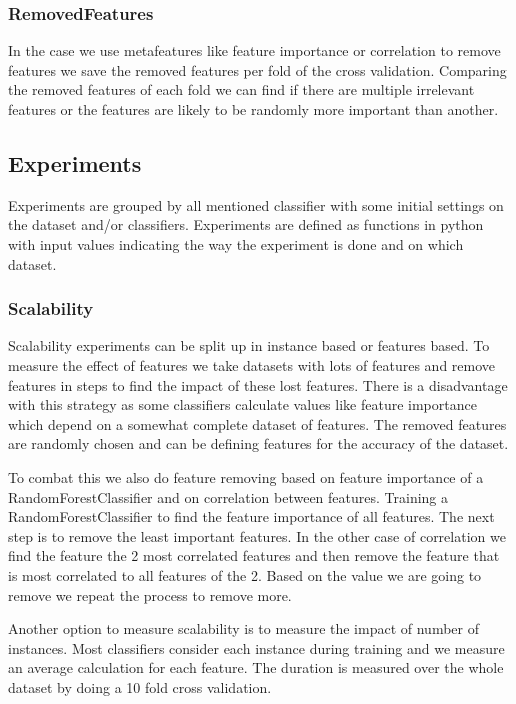 \documentclass[a4paper,10pt]{article}
\begin{document}
\subsubsection{RemovedFeatures}
In the case we use metafeatures like feature importance or correlation to remove features we save the removed features per fold of the cross validation. Comparing the removed features of each fold we can find if there are multiple irrelevant features or the features are likely to be randomly more important than another.

\subsection{Experiments}
Experiments are grouped by all mentioned classifier with some initial settings on the dataset and/or classifiers. Experiments are defined as functions in python with input values indicating the way the experiment is done and on which dataset.
\subsubsection{Scalability}
Scalability experiments can be split up in instance based or features based. To measure the effect of features we take datasets with lots of features and remove features in steps to find the impact of these lost features. There is a disadvantage with this strategy as some classifiers calculate values like feature importance which depend on a somewhat complete dataset of features. The removed features are randomly chosen and can be defining features for the accuracy of the dataset. 

To combat this we also do feature removing based on feature importance of a RandomForestClassifier and on correlation between features. Training a RandomForestClassifier to find the feature importance of all features. The next step is to remove the least important features. In the other case of correlation we find the feature the 2 most correlated features and then remove the feature that is most correlated to all features of the 2. Based on the value we are going to remove we repeat the process to remove more.


Another option to measure scalability is to measure the impact of number of instances. Most classifiers consider each instance during training and we measure an average calculation for each feature. The duration is measured over the whole dataset by doing a 10 fold cross validation.
\end{document}
